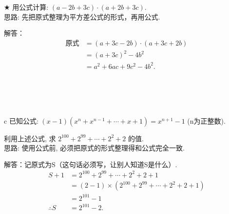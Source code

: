\begin{comment}
\item {
    多项式 $4a^2+9$ 加上一个单项式后, 可化为一个多项式的平方, 求这个单项式. 
    \\ \\ \\
}
\end{comment}

\begin{comment}
\item {
    已知 $a^2+a-1=0$, 求 $a^3 + 2a^2 + 2023$ 的值. 
    \\ \\ \\
}
\end{comment}

\item {
    $\bigstar$
    用公式计算: $(a-2b+3c)\cdot (a+2b+3c)$. 
    \ifshowSolution
    \fangsong{}
    \\
    思路: 先把原式整理为平方差公式的形式，再用公式. 

    解答：
    \begin{align*}
        \mbox{原式} &= (a+3c-2b)\cdot (a+3c+2b) \\
        &= (a+3c)^2 - 4b^2 \\
        &= a^2 + 6ac + 9c^2 - 4b^2. \\
    \end{align*}

    \else
        \\ \\ \\
    \fi
}

\item {
    c
    已知公式: $(x-1)(x^n + x^{n-1} + \cdots + x + 1) = x^{n+1} - 1$ (n为正整数). 
    
    利用上述公式, 求 $2^{100} + 2^{99} +\cdots + 2^2 + 2$ 的值. 
    \ifshowSolution
        \fangsong{}
        \\
        思路: 使用公式前, 必须把原式的形式整理得和公式完全一致. 

        解答：记原式为S（这句话必须写，让别人知道S是什么）. 
        \begin{align*}
            S + 1 &= 2^{100} + 2^{99} + \cdots + 2^2 + 2 + 1 \\
            &= (2-1)\times (2^{100} + 2^{99} + \cdots + 2^2 + 2 + 1) \\
            &= 2^{101} - 1 \\
            \therefore
            S &= 2^{101} - 2. 
        \end{align*}
    \else
        \\ \\ \\
    \fi
}


